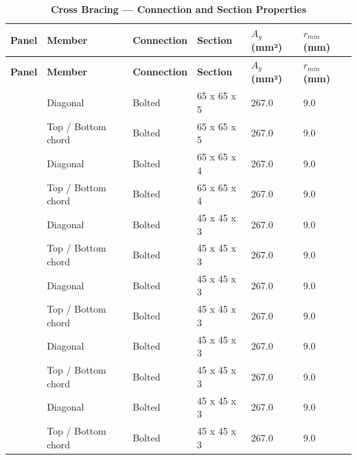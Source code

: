\documentclass[12pt,a4paper]{report}
\numberwithin{table}{chapter}
\numberwithin{figure}{chapter}
\begin{document}
\vspace{1em}

\vspace{0.4em}
\noindent
\setlength{\tabcolsep}{4pt}
\setlength\LTleft{0pt}
\setlength\LTright{\fill}

\begin{longtable}{|C{2.0cm}|L{2.0cm}|L{2.2cm}|C{2.5cm}|C{2.0cm}|C{2.0cm}|}
\caption{\textbf{Cross Bracing --- Connection and Section Properties}}
\hline
\textbf{Panel} & \textbf{Member} & \textbf{Connection} & \textbf{Section} & \textbf{$A_g$ (mm²)} & \textbf{$r_{min}$ (mm)} \\[6pt]
\hline
\endfirsthead
\hline
\textbf{Panel} & \textbf{Member} & \textbf{Connection} & \textbf{Section} & \textbf{$A_g$ (mm²)} & \textbf{$r_{min}$ (mm)} \\[6pt]
\hline
\endhead
{} & Diagonal & Bolted & 65 x 65 x 5 & 267.0 & 9.0 \\[6pt]
 & Top / Bottom chord & Bolted & 65 x 65 x 5 & 267.0 & 9.0 \\[6pt]
\hline
{} & Diagonal & Bolted & 65 x 65 x 4 & 267.0 & 9.0 \\[6pt]
 & Top / Bottom chord & Bolted & 65 x 65 x 4 & 267.0 & 9.0 \\[6pt]
\hline
{} & Diagonal & Bolted & 45 x 45 x 3 & 267.0 & 9.0 \\[6pt]
 & Top / Bottom chord & Bolted & 45 x 45 x 3 & 267.0 & 9.0 \\[6pt]
\hline
{} & Diagonal & Bolted & 45 x 45 x 3 & 267.0 & 9.0 \\[6pt]
 & Top / Bottom chord & Bolted & 45 x 45 x 3 & 267.0 & 9.0 \\[6pt]
\hline
{} & Diagonal & Bolted & 45 x 45 x 3 & 267.0 & 9.0 \\[6pt]
 & Top / Bottom chord & Bolted & 45 x 45 x 3 & 267.0 & 9.0 \\[6pt]
\hline
{} & Diagonal & Bolted & 45 x 45 x 3 & 267.0 & 9.0 \\[6pt]
 & Top / Bottom chord & Bolted & 45 x 45 x 3 & 267.0 & 9.0 \\[6pt]

\end{longtable}
\end{document}
